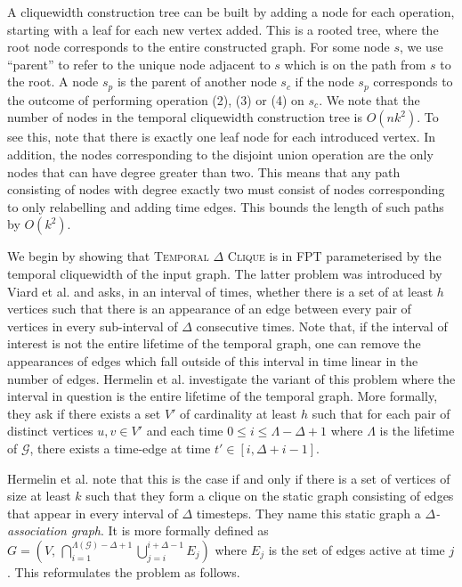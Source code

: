 \documentclass[preprint,12pt]{elsarticle}
\begin{document}
A cliquewidth construction tree can be built by adding a node for each operation, starting with a leaf for each new vertex added. This is a rooted tree, where the root node corresponds to the entire constructed graph. For some node $s$, we use ``parent'' to refer to the unique node adjacent to $s$ which is on the path from $s$ to the root. A node $s_p$ is the parent of another node $s_c$ if the node $s_p$ corresponds to the outcome of performing operation (2), (3) or (4) on $s_c$.  We note that the number of nodes in the temporal cliquewidth construction tree is $O(nk^2)$. To see this, note that there is exactly one leaf node for each introduced vertex. In addition, the nodes corresponding to the disjoint union operation are the only nodes that can have degree greater than two. This means that any path consisting of nodes with degree exactly two must consist of nodes corresponding to only relabelling and adding time edges. This bounds the length of such paths by $O(k^2)$.

We begin by showing that \textsc{Temporal $\Delta$ Clique} is in FPT parameterised by the temporal cliquewidth of the input graph. The latter problem was introduced by Viard et al. \cite{viard_computing_2016} and asks, in an interval of times, whether there is a set of at least $h$ vertices such that there is an appearance of an edge between every pair of vertices in every sub-interval of $\Delta$ consecutive times. Note that, if the interval of interest is not the entire lifetime of the temporal graph, one can remove the appearances of edges which fall outside of this interval in time linear in the number of edges. Hermelin et al. \cite{hermelin_temporal_2023} investigate the variant of this problem where the interval in question is the entire lifetime of the temporal graph. More formally, they ask if there exists a set $V'$ of cardinality at least $h$ such that for each pair of distinct vertices $u,v\in V'$ and each time $0\leq i\leq \Lambda-\Delta+1$ where $\Lambda$ is the lifetime of $\mathcal{G}$, there exists a time-edge at time $t'\in[i,\Delta+i-1]$. 


Hermelin et al. note that this is the case if and only if there is a set of vertices of size at least $k$ such that they form a clique on the static graph consisting of edges that appear in every interval of $\Delta$ timesteps. They name this static graph a $\Delta$\emph{-association graph}. It is more formally defined as $G=\left(V,\,\bigcap^{\Lambda(\mathcal{G})-\Delta+1}_{i=1}\bigcup^{i+\Delta-1}_{j=i}E_j\right)$ where $E_j$ is the set of edges active at time $j$. This reformulates the problem as follows.
\end{document}
